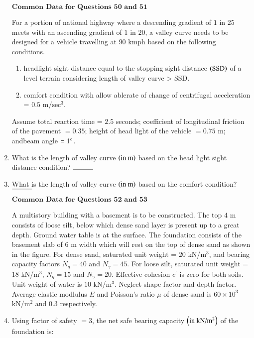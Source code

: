 \documentclass[journal,onecolumn]{IEEEtran}
\theoremstyle{remark}
\begin{document}
\begin{enumerate}
	$\textbf{Common Data for Questions 50 and 51}$
	\newline

	For a portion of national highway where a descending gradient of $1$ in $25$ meets with an ascending gradient of $1$ in $20$, a valley curve needs to be designed for a vehicle travelling at $90$ kmph based on the following conditions.
	\begin{enumerate}
		\item headlight sight distance equal to the stopping sight distance $\left(\text{SSD}\right)$ of a level terrain
considering length of valley curve > SSD. 
		\item comfort condition with allow ablerate of change of centrifugal acceleration = $0.5$ m/$\text{sec}^3$.
	\end{enumerate}
	Assume total reaction time = $2.5$ seconds; coefficient of longitudinal friction of the pavement $= 0.35$; height
of head light of the vehicle $= 0.75$ m; andbeam angle $= 1\degree$. 

    \item What is the length of valley curve $\left(\text{in m}\right)$ based on the head light sight distance condition? $\rule{1cm}{0.15mm}$

    \item What is the length of valley curve $\left(\text{in m}\right)$ based on the comfort condition? $\rule{1cm}{0.15mm}$

	$\textbf{Common Data for Questions 52 and 53}$
	\newline

	A multistory building with a basement is to be constructed. The top $4$ m consists of loose silt, below which dense sand layer is present up to a great depth. Ground water table is at the surface. The foundation consists of the basement slab of $6$ m width which will rest on the top of dense sand as shown in the figure. For dense sand, saturated unit weight = $20$ kN/$\text{m}^3$, and bearing capacity factors $N_q = 40$ and $N_{\gamma} = 45$. For loose silt, saturated unit weight = $18$ kN/$\text{m}^3$, $N_q = 15$ and $N_{\gamma} = 20$. Effective cohesion $c^{\prime}$ is zero for both soils. Unit weight of water is $10$ kN/$\text{m}^3$. Neglect shape factor and depth factor. 
	\newline
	Average elastic modlulus $E$ and Poisson's ratio $\mu$ of dense sand is $60 \times 10^3$ kN/$\text{m}^2$ and $0.3$ respectively.

    \item Using factor of safety $= 3$, the net safe bearing capacity $\left(\text{in kN/} \text{m}^2\right)$ of the foundation is:


\end{enumerate}
\end{document}
